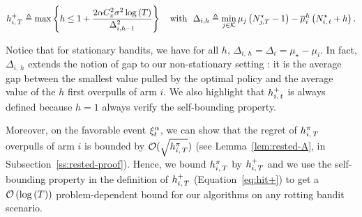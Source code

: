 \begin{equation}
\label{eq:hit+}
h_{i,\,T}^+ \triangleq \max \left\{ h \leq 
1 + \frac{2\alpha C_\pi^2 \sigma^2 \log \left(T\right)}{\Delta_{i,h-1}^2} \right\}\text{\quad with \ } \Delta_{i,h} \triangleq \min_{j \in \mathcal{K}} \mu_j\left(N_{j,T}^\star -1\right) - \overline{\mu}_i^h\left( N_{i,\,t}^\star+h \right). 
\end{equation}
\begin{remark}
Notice that for stationary bandits, we have for all $h$, $\Delta_{i,\,h} = \Delta_i = \mu_\star - \mu_i$. In fact, $ \Delta_{i,\,h} $ extends the notion of gap to our non-stationary setting : it is the average gap between the smallest value pulled by the optimal policy and the average value of the $h$ first overpulls of arm $i$.  We also highlight that $h_{i,\,t}^+$ is always defined because $h=1$ always verify the self-bounding property. 
\end{remark}

Moreover,  on the favorable event $\xi^\alpha_t$, we can show that the regret of $h_{i,\,T}^\pi$ overpulls of arm $i$ is bounded by $\mathcal{O} (\sqrt{h_{i,\,T}^\pi})$ (see Lemma~\ref{lem:rested-A}, in Subsection~\ref{ss:rested-proof}). Hence, we bound $h_{i,\,T}^\pi$ by $h_{i,\,T}^+$ and we use the self-bounding property in the definition of $h_{i,\,T}^+$ (Equation~\ref{eq:hit+}) to get a $\mathcal{O}\left(\log\left(T\right)\right)$ problem-dependent bound for our algorithms on any rotting bandit scenario. 

